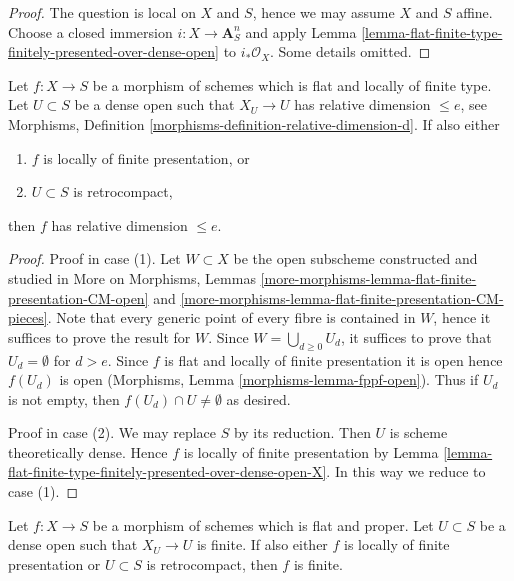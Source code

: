 \begin{proof}
The question is local on $X$ and $S$, hence we may assume $X$ and
$S$ affine. Choose a closed immersion $i : X \to \mathbf{A}^n_S$
and apply
Lemma \ref{lemma-flat-finite-type-finitely-presented-over-dense-open}
to $i_*\mathcal{O}_X$. Some details omitted.
\end{proof}

\begin{lemma}
\label{lemma-flat-finite-presentation-dimension-over-dense-open}
Let $f : X \to S$ be a morphism of schemes which is flat and locally
of finite type. Let $U \subset S$ be a dense open such that
$X_U \to U$ has relative dimension $\leq e$, see
Morphisms, Definition \ref{morphisms-definition-relative-dimension-d}.
If also either
\begin{enumerate}
\item $f$ is locally of finite presentation, or
\item $U \subset S$ is retrocompact,
\end{enumerate}
then $f$ has relative dimension $\leq e$.
\end{lemma}

\begin{proof}
Proof in case (1). Let $W \subset X$ be the open subscheme constructed
and studied in More on Morphisms, Lemmas
\ref{more-morphisms-lemma-flat-finite-presentation-CM-open} and
\ref{more-morphisms-lemma-flat-finite-presentation-CM-pieces}.
Note that every generic point of every fibre is contained in $W$,
hence it suffices to prove the result for $W$. Since
$W = \bigcup_{d \geq 0} U_d$, it suffices to prove that $U_d = \emptyset$
for $d > e$. Since $f$ is flat and locally of finite presentation it is open
hence $f(U_d)$ is open (Morphisms, Lemma \ref{morphisms-lemma-fppf-open}).
Thus if $U_d$ is not empty, then $f(U_d) \cap U \not = \emptyset$ as
desired.

\medskip\noindent
Proof in case (2). We may replace $S$ by its reduction. Then $U$ is
scheme theoretically dense. Hence $f$ is locally of finite presentation
by Lemma \ref{lemma-flat-finite-type-finitely-presented-over-dense-open-X}.
In this way we reduce to case (1).
\end{proof}

\begin{lemma}
\label{lemma-proper-flat-finite-over-dense-open}
Let $f : X \to S$ be a morphism of schemes which is flat and proper.
Let $U \subset S$ be a dense open such that $X_U \to U$ is finite.
If also either $f$ is locally of finite presentation or
$U \subset S$ is retrocompact, then $f$ is finite.
\end{lemma}

